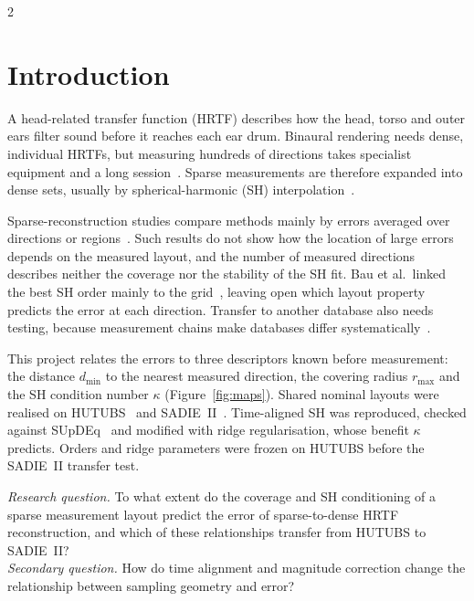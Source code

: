 \documentclass[11pt,a4paper]{article}
\newcommand{\dmin}{d_{\min}}
\newcommand{\rmax}{r_{\max}}
\begin{document}
\begingroup\small
\setlength{\columnsep}{22pt}
\begin{multicols}{2}
\setcounter{tocdepth}{1}
\tableofcontents
\end{multicols}
\endgroup

\section{Introduction}

A head-related transfer function (HRTF) describes how the head, torso and outer ears filter sound before it reaches each ear drum. Binaural rendering needs dense, individual HRTFs, but measuring hundreds of directions takes specialist equipment and a long session~\cite{li2020}. Sparse measurements are therefore expanded into dense sets, usually by spherical-harmonic (SH) interpolation~\cite{evans1998,duraiswami2004,romigh2015}.

Sparse-reconstruction studies compare methods mainly by errors averaged over directions or regions~\cite{benhur2019,arend2021,arend2023,thuillier2024}. Such results do not show how the location of large errors depends on the measured layout, and the number of measured directions describes neither the coverage nor the stability of the SH fit. Bau et al.\ linked the best SH order mainly to the grid~\cite{bau2022}, leaving open which layout property predicts the error at each direction. Transfer to another database also needs testing, because measurement chains make databases differ systematically~\cite{andreopoulou2015,wen2023}.

This project relates the errors to three descriptors known before measurement: the distance $\dmin$ to the nearest measured direction, the covering radius $\rmax$ and the SH condition number $\kappa$ (Figure~\ref{fig:maps}). Shared nominal layouts were realised on HUTUBS~\cite{brinkmann2019} and SADIE~II~\cite{armstrong2018}. Time-aligned SH was reproduced, checked against SUpDEq~\cite{supdeq} and modified with ridge regularisation, whose benefit $\kappa$ predicts. Orders and ridge parameters were frozen on HUTUBS before the SADIE~II transfer test.

\begin{center}
\colorbox{black!5}{\parbox{0.95\linewidth}{\vspace{3pt}
\emph{Research question.} To what extent do the coverage and SH conditioning of a sparse measurement layout predict the error of sparse-to-dense HRTF reconstruction, and which of these relationships transfer from HUTUBS to SADIE~II?\\[2pt]
\emph{Secondary question.} How do time alignment and magnitude correction change the relationship between sampling geometry and error?\vspace{3pt}}}
\end{center}
\end{document}
